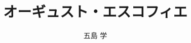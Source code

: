 
%
%
%

\title{\Huge{オーギュスト・エスコフィエ}\\}
\author{\huge{五島 学}}


\maketitle
\frontmatter



\mainmatter%
%




%


\backmatter
{\printindex}


